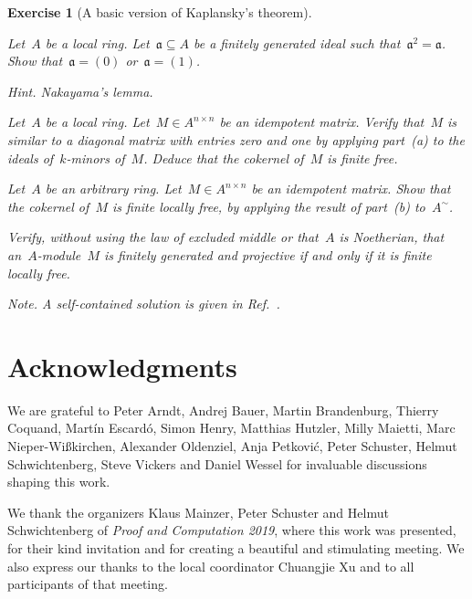 \documentclass{ws-rv9x6}
\newtheorem{ex}{Exercise}
\newenvironment{exercise}[1]{
  \begin{ex}[#1]
}{\end{ex}}
\newcommand{\aaa}{\mathfrak{a}}
\renewcommand{\_}{\mathpunct{.}}
\newcommand{\?}{\,{:}\,}
\begin{document}
\begin{exercise}{A basic version of Kaplansky's theorem}
\begin{alphlist}[(c)]
\item Let~$A$ be a local ring. Let~$\aaa \subseteq A$ be a finitely generated
ideal such that~$\aaa^2 = \aaa$. Show that~$\aaa = (0)$ or~$\aaa = (1)$.\smallskip

{\scriptsize\emph{Hint.} Nakayama's lemma.\par}
\item Let~$A$ be a local ring. Let~$M \in A^{n \times n}$ be an idempotent
matrix. Verify that~$M$ is similar to a diagonal matrix with entries zero and
one by applying part~(a) to the ideals of~$k$-minors of~$M$. Deduce that the
cokernel of~$M$ is finite free.
\item Let~$A$ be an arbitrary ring. Let~$M \in A^{n \times n}$ be an idempotent
matrix. Show that the cokernel of~$M$ is finite locally free, by applying the
result of part~(b) to~$A^\sim$.
\item Verify, without using the law of excluded middle or that~$A$ is
Noetherian, that an~$A$-module~$M$ is finitely generated and projective if and
only if it is finite locally free.\smallskip

{\scriptsize\emph{Note.} A self-contained solution is given in
Ref.~.\par}
\end{alphlist}
\end{exercise}


\section*{Acknowledgments}

We are grateful to Peter Arndt, Andrej Bauer,
Martin Brandenburg, Thierry Coquand, Martín Escardó, Simon Henry, Matthias
Hutzler, Milly Maietti, Marc Nieper-Wißkirchen, Alexander Oldenziel, Anja
Petković, Peter Schuster, Helmut Schwichtenberg, Steve Vickers and Daniel
Wessel for invaluable discussions shaping this work.

We thank the
organizers Klaus Mainzer, Peter Schuster and Helmut Schwich\-ten\-berg of
\emph{Proof and Computation 2019}, where this work was presented, for their
kind invitation and for creating a beautiful and stimulating meeting. We also
express our thanks to the local coordinator Chuangjie Xu and to all
participants of that meeting.




\end{document}
